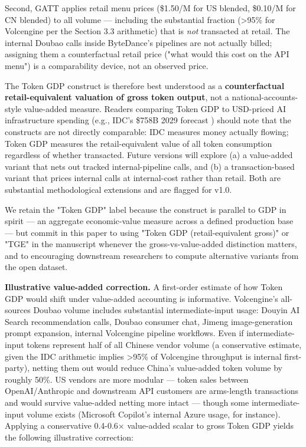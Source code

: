 \documentclass[11pt,a4paper]{article}
\begin{document}
Second, GATT applies retail menu prices (\$1.50/M for US blended, \$0.10/M for CN blended) to all volume --- including the substantial fraction (>95\% for Volcengine per the Section 3.3 arithmetic) that is \emph{not} transacted at retail. The internal Doubao calls inside ByteDance's pipelines are not actually billed; assigning them a counterfactual retail price ("what would this cost on the API menu") is a comparability device, not an observed price.

The Token GDP construct is therefore best understood as a \textbf{counterfactual retail-equivalent valuation of gross token output}, not a national-accounts-style value-added measure. Readers comparing Token GDP to USD-priced AI infrastructure spending (e.g., IDC's \$758B 2029 forecast \cite{idc2025infrastructure}) should note that the constructs are not directly comparable: IDC measures money actually flowing; Token GDP measures the retail-equivalent value of all token consumption regardless of whether transacted. Future versions will explore (a) a value-added variant that nets out tracked internal-pipeline calls, and (b) a transaction-based variant that prices internal calls at internal-cost rather than retail. Both are substantial methodological extensions and are flagged for v1.0.

We retain the "Token GDP" label because the construct is parallel to GDP in spirit --- an aggregate economic-value measure across a defined production base --- but commit in this paper to using "Token GDP (retail-equivalent gross)" or "TGE" in the manuscript whenever the gross-vs-value-added distinction matters, and to encouraging downstream researchers to compute alternative variants from the open dataset.

\textbf{Illustrative value-added correction.} A first-order estimate of how Token GDP would shift under value-added accounting is informative. Volcengine's all-sources Doubao volume includes substantial intermediate-input usage: Douyin AI Search recommendation calls, Doubao consumer chat, Jimeng image-generation prompt expansion, internal Volcengine pipeline workflows. Even if intermediate-input tokens represent half of all Chinese vendor volume (a conservative estimate, given the IDC arithmetic implies >95\% of Volcengine throughput is internal first-party), netting them out would reduce China's value-added token volume by roughly 50\%. US vendors are more modular --- token sales between OpenAI/Anthropic and downstream API customers are arms-length transactions and would survive value-added netting more intact --- though some intermediate-input volume exists (Microsoft Copilot's internal Azure usage, for instance). Applying a conservative 0.4-0.6× value-added scalar to gross Token GDP yields the following illustrative correction:
\end{document}
